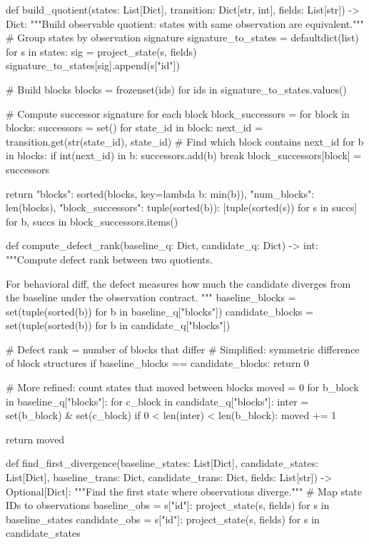 def build_quotient(states: List[Dict], transition: Dict[str, int], fields: List[str]) -> Dict:
    """Build observable quotient: states with same observation are equivalent."""
    # Group states by observation signature
    signature_to_states = defaultdict(list)
    for s in states:
        sig = project_state(s, fields)
        signature_to_states[sig].append(s["id"])
    
    # Build blocks
    blocks = {frozenset(ids) for ids in signature_to_states.values()}
    
    # Compute successor signature for each block
    block_successors = {}
    for block in blocks:
        successors = set()
        for state_id in block:
            next_id = transition.get(str(state_id), state_id)
            # Find which block contains next_id
            for b in blocks:
                if int(next_id) in b:
                    successors.add(b)
                    break
        block_successors[block] = successors
    
    return {
        "blocks": sorted(blocks, key=lambda b: min(b)),
        "num_blocks": len(blocks),
        "block_successors": {tuple(sorted(b)): [tuple(sorted(s)) for s in succs] 
                              for b, succs in block_successors.items()}
    }

def compute_defect_rank(baseline_q: Dict, candidate_q: Dict) -> int:
    """Compute defect rank between two quotients.
    
    For behavioral diff, the defect measures how much the candidate
    diverges from the baseline under the observation contract.
    """
    baseline_blocks = set(tuple(sorted(b)) for b in baseline_q["blocks"])
    candidate_blocks = set(tuple(sorted(b)) for b in candidate_q["blocks"])
    
    # Defect rank = number of blocks that differ
    # Simplified: symmetric difference of block structures
    if baseline_blocks == candidate_blocks:
        return 0
    
    # More refined: count states that moved between blocks
    moved = 0
    for b_block in baseline_q["blocks"]:
        for c_block in candidate_q["blocks"]:
            inter = set(b_block) & set(c_block)
            if 0 < len(inter) < len(b_block):
                moved += 1
    
    return moved

def find_first_divergence(baseline_states: List[Dict], candidate_states: List[Dict], 
                           baseline_trans: Dict, candidate_trans: Dict,
                           fields: List[str]) -> Optional[Dict]:
    """Find the first state where observations diverge."""
    # Map state IDs to observations
    baseline_obs = {s["id"]: project_state(s, fields) for s in baseline_states}
    candidate_obs = {s["id"]: project_state(s, fields) for s in candidate_states}
    
